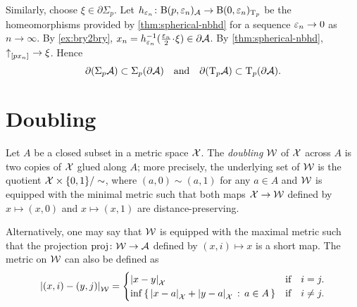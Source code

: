 Similarly, choose $\xi\in\partial\Sigma_p$.
Let $h_{\varepsilon_n}\colon\mathrm{B}{}(p,\varepsilon_n)_{\mathcal{A}}\to \mathrm{B}{}(0,\varepsilon_n)_{\mathrm{T}_p}$ be the homeomorphisms provided by \ref{thm:spherical-nbhd} for a sequence $\varepsilon_n\to 0$ as $n\to\infty$.
By \ref{ex:bry2bry}, $x_n=h_{\eps_n}^{-1}(\tfrac{\eps_n}2\cdot\xi)\in \partial \spc{A}$.
By \ref{thm:spherical-nbhd}, ${\uparrow}_{[{p}{x_n}]_{{}}}\to \xi$.
Hence
\[\partial (\Sigma_p\mathcal{A})\subset\Sigma_p(\partial\mathcal{A})
\quad\text{and}\quad\partial(\mathrm{T}_p\mathcal{A})\subset\mathrm{T}_p(\partial\mathcal{A}).\]
\qedsf

\section{Doubling}

Let $A$ be a closed subset in a metric space $\mathcal{X}$.
The \emph{doubling} $\mathcal{W}$ of $\mathcal{X}$ across $A$ is two copies of $\mathcal{X}$ glued along $A$;
more precisely, the underlying set of $\mathcal{W}$ is the quotient $\mathcal{X}\times\{0,1\}/\sim$, where $(a,0)\sim (a,1)$ for any $a\in A$ and $\mathcal{W}$ is equipped with the minimal metric such that both maps $\mathcal{X}\to \mathcal{W}$ defined by $x\mapsto (x,0)$ and $x\mapsto (x,1)$ are distance-preserving.

Alternatively, one may say that $\mathcal{W}$ is equipped with the maximal metric such that the projection $\operatorname{\rm proj}\nolimits\colon\mathcal{W}\to\mathcal{A}$ defined by $(x,i)\mapsto x$ is a short map. 
The metric on $\mathcal{W}$ can also be defined as
\[|{(x,i)}-{(y,j)}|_{\mathcal{W}}^{{}}=
\begin{cases}
|{x}-{y}|_{\mathcal{X}}^{{}}&\text{if}\quad i= j.
\\
\inf\left\{\,{|{x}-{a}|_{\mathcal{X}}^{{}}+|{y}-{a}|_{\mathcal{X}}^{{}}}\,:\,{a\in A}\,\right\}&\text{if}\quad i\ne j.
\end{cases}
\]

